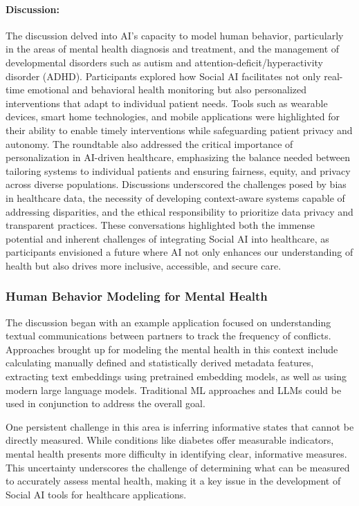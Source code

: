 \paragraph{Discussion:}
The discussion delved into AI's capacity to model human behavior, particularly in the areas of mental health diagnosis and treatment, and the management of developmental disorders such as autism and attention-deficit/hyperactivity disorder (ADHD). Participants explored how Social AI facilitates not only real-time emotional and behavioral health monitoring but also personalized interventions that adapt to individual patient needs. Tools such as wearable devices, smart home technologies, and mobile applications were highlighted for their ability to enable timely interventions while safeguarding patient privacy and autonomy. The roundtable also addressed the critical importance of personalization in AI-driven healthcare, emphasizing the balance needed between tailoring systems to individual patients and ensuring fairness, equity, and privacy across diverse populations. Discussions underscored the challenges posed by bias in healthcare data, the necessity of developing context-aware systems capable of addressing disparities, and the ethical responsibility to prioritize data privacy and transparent practices. These conversations highlighted both the immense potential and inherent challenges of integrating Social AI into healthcare, as participants envisioned a future where AI not only enhances our understanding of health but also drives more inclusive, accessible, and secure care.
\subsubsection{Human Behavior Modeling for Mental Health}


The discussion began with an example application focused on understanding textual communications between partners to track the frequency of conflicts.  Approaches brought up for modeling the mental health  in this context include calculating manually defined and statistically derived metadata features, extracting text embeddings using pretrained embedding models, as well as using modern large language models. Traditional ML approaches and LLMs could be used in conjunction to address the overall goal.

One persistent challenge in this area is inferring informative states that cannot be directly measured. While conditions like diabetes offer measurable indicators, mental health presents more difficulty in identifying clear, informative measures. This uncertainty underscores the challenge of determining what can be measured to accurately assess mental health, making it a key issue in the development of Social AI tools for healthcare applications.

